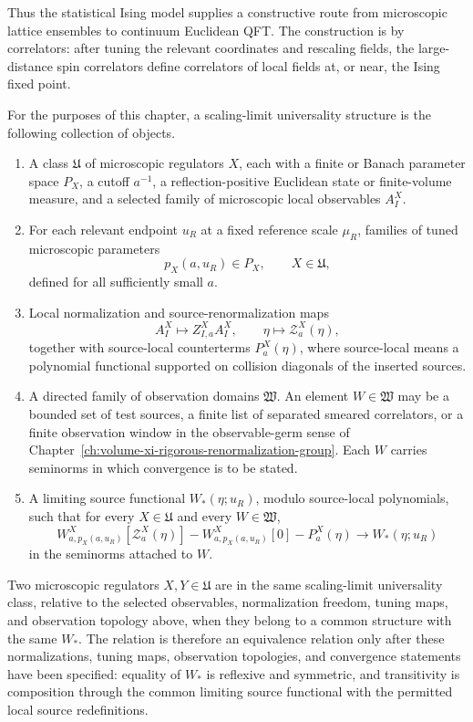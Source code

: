 Thus the statistical Ising model supplies a constructive route from
microscopic lattice ensembles to continuum Euclidean QFT.  The construction is
by correlators: after tuning the relevant coordinates and rescaling fields, the
large-distance spin correlators define correlators of local fields at, or near,
the Ising fixed point.

\begin{definition}
\label{def:scaling-limit-universality-structure}
For the purposes of this chapter, a scaling-limit universality structure is the
following collection of objects.
\begin{enumerate}[label=\textup{(\roman*)}]
\item A class \(\mathfrak U\) of microscopic regulators \(X\), each with a
finite or Banach parameter space \(P_X\), a cutoff \(a^{-1}\), a
reflection-positive Euclidean state or finite-volume measure, and a selected
family of microscopic local observables \(A^X_I\).
\item For each relevant endpoint \(u_R\) at a fixed reference scale \(\mu_R\),
families of tuned microscopic parameters
\[
  p_X(a,u_R)\in P_X ,
  \qquad X\in\mathfrak U ,
\]
defined for all sufficiently small \(a\).
\item Local normalization and source-renormalization maps
\[
  A^X_I\longmapsto Z^X_{I,a}A^X_I,
  \qquad
  \eta\longmapsto\mathcal Z^X_a(\eta),
\]
together with source-local counterterms \(P^X_a(\eta)\), where source-local
means a polynomial functional supported on collision diagonals of the inserted
sources.
\item A directed family of observation domains \(\mathfrak W\).  An element
\(W\in\mathfrak W\) may be a bounded set of test sources, a finite list of
separated smeared correlators, or a finite observation window in the
observable-germ sense of
Chapter~\ref{ch:volume-xi-rigorous-renormalization-group}.  Each
\(W\) carries seminorms in which convergence is to be stated.
\item A limiting source functional \(W_\ast(\eta;u_R)\), modulo source-local
polynomials, such that for every \(X\in\mathfrak U\) and every
\(W\in\mathfrak W\),
\begin{equation}
  W^X_{a,p_X(a,u_R)}[\mathcal Z^X_a(\eta)]
  -
  W^X_{a,p_X(a,u_R)}[0]
  -
  P^X_a(\eta)
  \longrightarrow
  W_\ast(\eta;u_R)
  \label{eq:scaling-limit-universality-structure-convergence}
\end{equation}
in the seminorms attached to \(W\).
\end{enumerate}
Two microscopic regulators \(X,Y\in\mathfrak U\) are in the same
scaling-limit universality class, relative to the selected observables,
normalization freedom, tuning maps, and observation topology above, when they
belong to a common structure with the same \(W_\ast\).  The relation is
therefore an equivalence relation only after these normalizations, tuning maps,
observation topologies, and convergence statements have
been specified: equality of \(W_\ast\) is reflexive and symmetric, and
transitivity is composition through the common limiting source functional
with the permitted local source redefinitions.
\end{definition}


